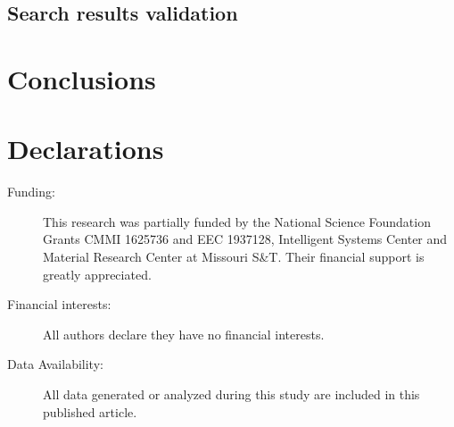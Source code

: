 \documentclass[pdflatex,sn-mathphys]{sn-jnl}
\begin{document}
	\subsection{Search results validation}
	
	\FloatBarrier

\section{Conclusions}


\section{Declarations}
\begin{description}
	\item[Funding:] This research was partially funded by the National Science Foundation Grants CMMI 1625736 and EEC 1937128, Intelligent Systems Center and Material Research Center at Missouri S\&T. Their financial support is greatly appreciated.
	\item[Financial interests:] All authors declare they have no financial interests.
	\item[Data Availability:] All data generated or analyzed during this study are included in this published article.
\end{description}



\end{document}
